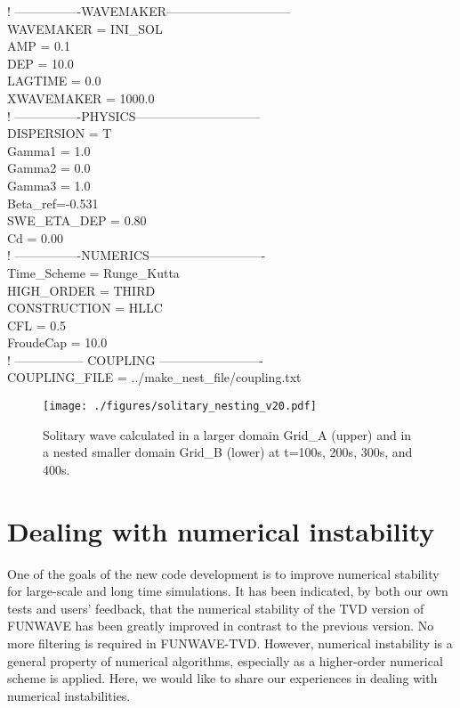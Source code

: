 \documentclass[11pt]{article}
\begin{document}
  ! ----------------WAVEMAKER------------------------------\\
 WAVEMAKER = INI\_SOL\\
  AMP = 0.1\\
DEP = 10.0\\
LAGTIME = 0.0\\
XWAVEMAKER = 1000.0\\


! ----------------PHYSICS------------------------------\\
DISPERSION = T\\
Gamma1 = 1.0\\
Gamma2 = 0.0\\
Gamma3 = 1.0\\
Beta\_ref=-0.531\\
SWE\_ETA\_DEP = 0.80\\
Cd = 0.00\\

  ! ----------------NUMERICS----------------------------\\
  Time\_Scheme = Runge\_Kutta\\
HIGH\_ORDER = THIRD\\
CONSTRUCTION = HLLC\\
CFL = 0.5\\
FroudeCap = 10.0\\

  ! ----------------- COUPLING -------------------------\\
  COUPLING\_FILE = ../make\_nest\_file/coupling.txt

\begin{figure}[htbp]
\centering
\texttt{[image: ./figures/solitary\_nesting\_v20.pdf]}
\caption{Solitary wave calculated in a larger domain Grid\_A (upper) and in a nested smaller domain Grid\_B (lower) at t=100s, 200s, 300s, and 400s.}
\label{nesting}
\end{figure}


\section{Dealing with numerical instability}

One of the goals of the new code development is to improve numerical stability for large-scale and long time simulations. It has been indicated, by both our own tests and users' feedback, that the numerical stability of the TVD version of FUNWAVE has been greatly improved in contrast to the previous version. No more filtering is required in FUNWAVE-TVD. However, numerical instability is a general property of numerical algorithms, especially as a higher-order numerical scheme is applied. Here, we would like to share our experiences in dealing with
numerical instabilities.
\end{document}
